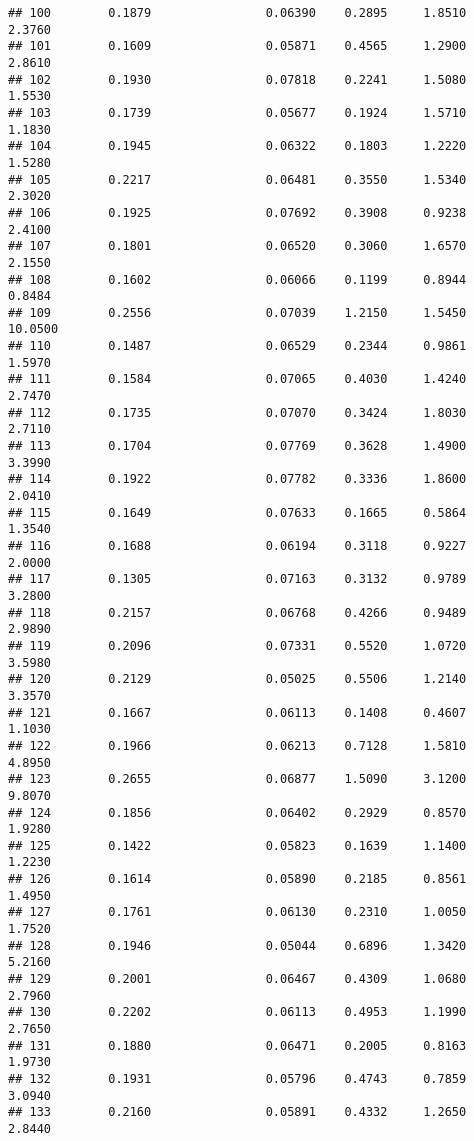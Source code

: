 \documentclass[
]{article}
\begin{document}
\begin{verbatim}
## 100        0.1879                0.06390    0.2895     1.8510       2.3760
## 101        0.1609                0.05871    0.4565     1.2900       2.8610
## 102        0.1930                0.07818    0.2241     1.5080       1.5530
## 103        0.1739                0.05677    0.1924     1.5710       1.1830
## 104        0.1945                0.06322    0.1803     1.2220       1.5280
## 105        0.2217                0.06481    0.3550     1.5340       2.3020
## 106        0.1925                0.07692    0.3908     0.9238       2.4100
## 107        0.1801                0.06520    0.3060     1.6570       2.1550
## 108        0.1602                0.06066    0.1199     0.8944       0.8484
## 109        0.2556                0.07039    1.2150     1.5450      10.0500
## 110        0.1487                0.06529    0.2344     0.9861       1.5970
## 111        0.1584                0.07065    0.4030     1.4240       2.7470
## 112        0.1735                0.07070    0.3424     1.8030       2.7110
## 113        0.1704                0.07769    0.3628     1.4900       3.3990
## 114        0.1922                0.07782    0.3336     1.8600       2.0410
## 115        0.1649                0.07633    0.1665     0.5864       1.3540
## 116        0.1688                0.06194    0.3118     0.9227       2.0000
## 117        0.1305                0.07163    0.3132     0.9789       3.2800
## 118        0.2157                0.06768    0.4266     0.9489       2.9890
## 119        0.2096                0.07331    0.5520     1.0720       3.5980
## 120        0.2129                0.05025    0.5506     1.2140       3.3570
## 121        0.1667                0.06113    0.1408     0.4607       1.1030
## 122        0.1966                0.06213    0.7128     1.5810       4.8950
## 123        0.2655                0.06877    1.5090     3.1200       9.8070
## 124        0.1856                0.06402    0.2929     0.8570       1.9280
## 125        0.1422                0.05823    0.1639     1.1400       1.2230
## 126        0.1614                0.05890    0.2185     0.8561       1.4950
## 127        0.1761                0.06130    0.2310     1.0050       1.7520
## 128        0.1946                0.05044    0.6896     1.3420       5.2160
## 129        0.2001                0.06467    0.4309     1.0680       2.7960
## 130        0.2202                0.06113    0.4953     1.1990       2.7650
## 131        0.1880                0.06471    0.2005     0.8163       1.9730
## 132        0.1931                0.05796    0.4743     0.7859       3.0940
## 133        0.2160                0.05891    0.4332     1.2650       2.8440

\end{verbatim}
\end{document}
